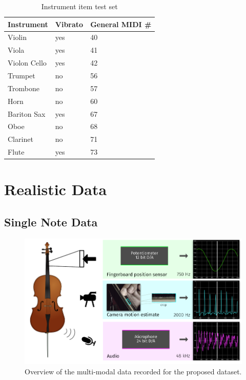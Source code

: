 \begin{table}
\begin{center}
\footnotesize
\begin{tabular}{ l l l}
  Instrument & Vibrato &  General MIDI \# \\
  \hline
  Violin & yes & 40 \\
  Viola & yes & 41 \\
  Violon Cello & yes & 42 \\
  Trumpet & no & 56 \\
  Trombone & no & 57\\
  Horn & no & 60  \\
  Bariton Sax & yes & 67 \\ %
  Oboe & no & 68\\
  Clarinet & no & 71\\
  Flute & yes & 73\\
\end{tabular}
\end{center}
\caption{Instrument item test set}
\label{tab:testset}
\end{table}

\section{Realistic Data}

\subsection{Single Note Data}

\begin{figure}[h]
  \centering
  \includegraphics[width=\textwidth]{Chapters/04_Data/figures/teaser.pdf}
  \caption{Overview of the multi-modal data recorded for the proposed dataset.}
\label{fig:teaser}
\end{figure}

